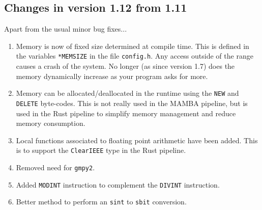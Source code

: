 \subsection{Changes in version 1.12 from 1.11}
Apart from the usual minor bug fixes...
\begin{enumerate}
\item Memory is now of fixed size determined at compile time.
This is defined in the variables \verb|*MEMSIZE| in the file
\verb|config.h|. Any access outside of the range causes a crash
of the system. No longer (as since version 1.7)
does the memory dynamically increase as your
program asks for more.
\item Memory can be allocated/deallocated in the runtime
	using the \verb|NEW| and \verb|DELETE| byte-codes.
	This is not really used in the MAMBA pipeline, but
	is used in the Rust pipeline to simplify memory
	management and reduce memory consumption.
\item Local functions associated to floating point arithmetic
	have been added. This is to support the 
	\verb|ClearIEEE| type in the Rust pipeline.
\item Removed need for \verb|gmpy2|.
\item Added \verb|MODINT| instruction to complement the
	\verb|DIVINT| instruction.
\item Better method to perform an \verb|sint| to \verb|sbit| conversion.
\end{enumerate}


